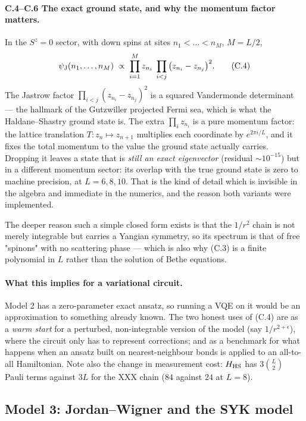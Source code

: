 \paragraph{\textsf{C.4}--\textsf{C.6} The exact ground state, and why the
momentum factor matters.}
In the $S^z=0$ sector, with down spins at sites $n_1<\dots<n_M$, $M=L/2$,
\begin{equation}
  \psi_{\rm J}(n_1,\dots,n_M)\;\propto\;
  \prod_{i=1}^{M} z_{n_i}\;\prod_{i<j}\big(z_{n_i}-z_{n_j}\big)^2 .
  \tag{C.4}
\end{equation}
The Jastrow factor $\prod_{i<j}(z_{n_i}-z_{n_j})^2$ is a squared Vandermonde
determinant --- the hallmark of the Gutzwiller projected Fermi sea, which is
what the Haldane--Shastry ground state is. The extra $\prod_i z_{n_i}$ is a
pure momentum factor: the lattice translation $T: z_n\mapsto z_{n+1}$
multiplies each coordinate by $e^{2\pi i/L}$, and it fixes the total momentum
to the value the ground state actually carries. Dropping it leaves a state that
is \emph{still an exact eigenvector} (residual $\sim10^{-15}$) but in a
different momentum sector: its overlap with the true ground state is zero to
machine precision, at $L=6,8,10$. That is the kind of detail which is invisible
in the algebra and immediate in the numerics, and the reason both variants were
implemented.

The deeper reason such a simple closed form exists is that the $1/r^2$ chain is
not merely integrable but carries a Yangian symmetry, so its spectrum is that
of free "spinons" with no scattering phase --- which is also why (C.3) is a
finite polynomial in $L$ rather than the solution of Bethe equations.

\paragraph{What this implies for a variational circuit.}
Model 2 has a zero-parameter exact ansatz, so running a VQE on it would be an
approximation to something already known. The two honest uses of (C.4) are as a
\emph{warm start} for a perturbed, non-integrable version of the model (say
$1/r^{2+\epsilon}$), where the circuit only has to represent corrections; and
as a benchmark for what happens when an ansatz built on nearest-neighbour bonds
is applied to an all-to-all Hamiltonian. Note also the change in measurement
cost: $H_{\rm HS}$ has $3\binom{L}{2}$ Pauli terms against $3L$ for the XXX
chain ($84$ against $24$ at $L=8$).

\subsection{Model 3: Jordan--Wigner and the SYK model}

